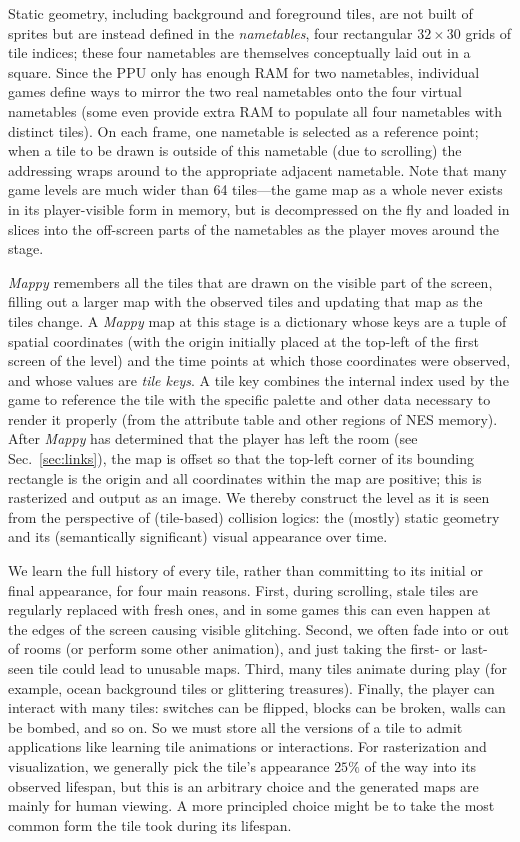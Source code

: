 \documentclass[12pt]{report}
\begin{document}
Static geometry, including background and foreground tiles, are not built of sprites but are instead defined in the \emph{nametables}, four rectangular \(32 \times 30\) grids of tile indices; these four nametables are themselves conceptually laid out in a square.
Since the PPU only has enough RAM for two nametables, individual games define ways to mirror the two real nametables onto the four virtual nametables (some even provide extra RAM to populate all four nametables with distinct  tiles).
On each frame, one nametable is selected as a reference point; when a tile to be drawn is outside of this nametable (due to scrolling) the addressing wraps around to the appropriate adjacent nametable.
Note that many game levels are much wider than 64 tiles---the game map as a whole never exists in its player-visible form in memory, but is decompressed on the fly and loaded in slices into the off-screen parts of the nametables as the player moves around the stage.

\emph{Mappy} remembers all the tiles that are drawn on the visible part of the screen, filling out a larger map with the observed tiles and updating that map as the tiles change.
A \emph{Mappy} map at this stage is a dictionary whose keys are a tuple of spatial coordinates (with the origin initially placed at the top-left of the first screen of the level) and the time points at which those coordinates were observed, and whose values are \emph{tile keys}.
A tile key combines the internal index used by the game to reference the tile with the specific palette and other data necessary to render it properly (from the attribute table and other regions of NES memory).
After \emph{Mappy} has determined that the player has left the room (see Sec.~\ref{sec:links}), the map is offset so that the top-left corner of its bounding rectangle is the origin and all coordinates within the map are positive; this is rasterized and output as an image.
We thereby construct the level as it is seen from the perspective of (tile-based) collision logics: the (mostly) static geometry and its (semantically significant) visual appearance over time.

We learn the full history of every tile, rather than committing to its initial or final appearance, for four main reasons.
First, during scrolling, stale tiles are regularly replaced with fresh ones, and in some games this can even happen at the edges of the screen causing visible glitching.
Second, we often fade into or out of rooms (or perform some other animation), and just taking the first- or last- seen tile could lead to unusable maps.
Third, many tiles animate during play (for example, ocean background tiles or glittering treasures).
Finally, the player can interact with many tiles: switches can be flipped, blocks can be broken, walls can be bombed, and so on.
So we must store all the versions of a tile to admit applications like learning tile animations or interactions.
For rasterization and visualization, we generally pick the tile's appearance $25\%$ of the way into its observed lifespan, but this is an arbitrary choice and the generated maps are mainly for human viewing.
A more principled choice might be to take the most common form the tile took during its lifespan.
\end{document}
